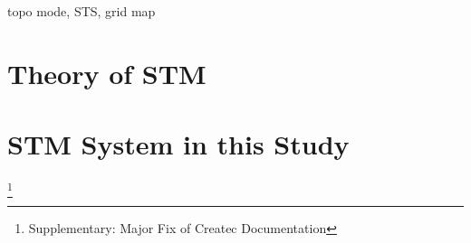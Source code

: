 topo mode, STS, grid map
\section{Theory of STM}
\section{STM System in this Study}
\footnote{Supplementary: Major Fix of Createc Documentation}

